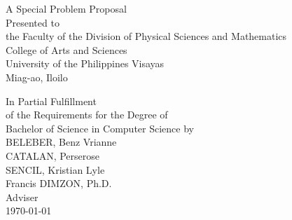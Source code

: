 \begin{titlepage}
\centering


\vspace{1.75cm}
A Special Problem Proposal\\
Presented to\\
the Faculty of the Division of Physical Sciences and Mathematics\\
College of Arts and Sciences\\
University of the Philippines Visayas\\
Miag-ao, Iloilo

\vspace{1.75cm}
In Partial Fulfillment\\
of the Requirements for the Degree of\\
Bachelor of Science in Computer Science
\vspace{1.75cm}
by\\

\vspace{1cm}
BELEBER, Benz Vrianne  \\
CATALAN, Perserose  \\
SENCIL, Kristian Lyle  \\

\vspace{1.75cm}
Francis DIMZON, Ph.D. \\
Adviser\\

\vspace{1.75cm}
\today
\end{titlepage}
